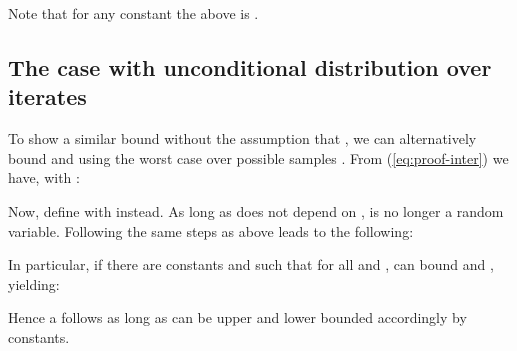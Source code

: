 \documentclass{article}
\renewcommand{\eqref}[1]{(\ref{#1})}
\begin{document}
Note that for any constant  the above is .

\subsection{The case with unconditional distribution over iterates}
\label{sec:proof2-unconditional}

To show a similar bound without the assumption that , we can alternatively bound  and  using the worst case over possible samples . From \eqref{eq:proof-inter} we have, with :

Now, define  with  instead. As long as  does not depend on ,  is no longer a random variable. Following the same steps as above leads to the following:


In particular, if there are constants  and  such that
 for all  and , can bound  and , yielding:


Hence a  follows as long as  can be upper and lower bounded accordingly by constants. 
\end{document}
